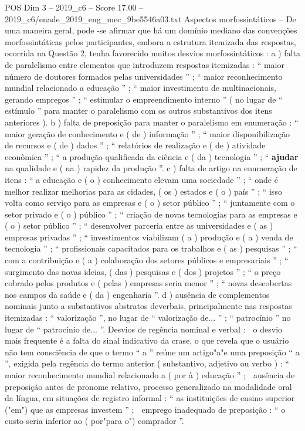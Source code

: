 \begin{textsample}{POS Dim 3 – 2019\_c6 – Score 17.00 – 2019\_c6/enade\_2019\_eng\_mec\_9be5546a03.txt}
Aspectos morfossintáticos – De uma maneira geral, pode -se afirmar que há um domínio mediano das convenções morfossintáticas pelos participantes, embora a estrutura itemizada das respostas, ocorrida na Questão 2, tenha favorecido muitos desvios morfossintáticos : a ) falta de paralelismo entre elementos que introduzem respostas itemizadas : “ maior número de doutores formados pelas universidades ” ; “ maior reconhecimento mundial relacionado a educação ” ; “ maior investimento de multinacionais, gerando empregos ” ; “ estimular o empreendimento interno ” ( no lugar de “ estímulo ” para manter o paralelismo com os outros substantivos dos itens anteriores ). b ) falta de preposição para manter o paralelismo em enumeração : “ maior geração de conhecimento e ( de ) informação ” ; “ maior disponibilização de recursos e ( de ) dados ” ; “ relatórios de realização e ( de ) atividade econômica ” ; “ a produção qualificada da ciência e ( da ) tecnologia ” ; “ \textbf{ajudar} na qualidade e ( na ) rapidez da produção ”. c ) falta de artigo na enumeração de itens : “ a educação e ( o ) conhecimento elevam uma sociedade ” ; “ onde é melhor realizar melhorias para as cidades, ( os ) estados e ( o ) país ” ; “ isso volta como serviço para as empresas e ( o ) setor público ” ; “ juntamente com o setor privado e ( o ) público ” ; “ criação de novas tecnologias para as empresas e ( o ) setor público ” ; “ desenvolver parceria entre as universidades e ( as ) empresas privadas ” ; “ investimentos viabilizam ( a ) produção e ( a ) venda de tecnologia ” ; “ profissionais capacitados para os trabalhos e ( as ) pesquisas ” ; “ com a contribuição e ( a ) colaboração dos setores públicos e empresariais ” ; “ surgimento das novas ideias, ( das ) pesquisas e ( dos ) projetos ” ; “ o preço cobrado pelos produtos e ( pelas ) empresas seria menor ” ; “ novas descobertas nos campos da saúde e ( da ) engenharia ”. d ) ausência de complementos nominais junto a substantivos abstratos deverbais, principalmente nas respostas itemizadas : “ valorização ”, no lugar de “ valorização de... ” ; “ patrocínio ” no lugar de “ patrocínio de... ”.
Desvios de regência nominal e verbal :  o desvio mais frequente é a falta do sinal indicativo da crase, o que revela que o usuário não tem consciência de que o termo “ a ” reúne um artigo"a"e uma preposição “ a ”, exigida pela regência do termo anterior ( substantivo, adjetivo ou verbo ) : “ maior reconhecimento mundial relacionado a ( por à ) educação ” ;  ausência de preposição antes de pronome relativo, processo generalizado na modalidade oral da língua, em situações de registro informal : “ as instituições de ensino superior ("em") que as empresas investem ” ;  emprego inadequado de preposição : “ o custo seria inferior ao ( por"para o") comprador ”.

\end{textsample}

